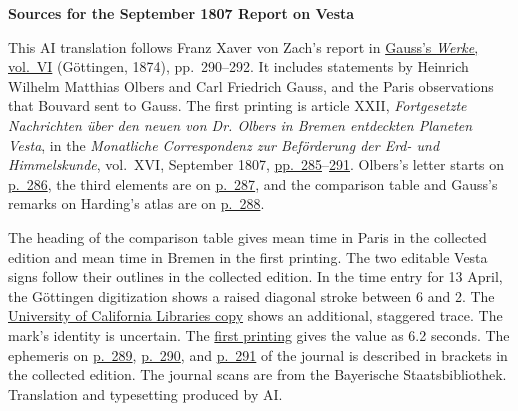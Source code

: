 \clearpage\thispagestyle{empty}
\begin{center}\textbf{Sources for the September 1807 Report on Vesta}\end{center}
\noindent This AI translation follows Franz Xaver von Zach’s report in \href{https://gdz.sub.uni-goettingen.de/id/PPN236007467}{Gauss’s \textit{Werke}, vol.~VI} (Göttingen, 1874), pp.~290--292. It includes statements by Heinrich Wilhelm Matthias Olbers and Carl Friedrich Gauss, and the Paris observations that Bouvard sent to Gauss. The first printing is article XXII, \textit{Fortgesetzte Nachrichten über den neuen von Dr. Olbers in Bremen entdeckten Planeten Vesta}, in the \textit{Monatliche Correspondenz zur Beförderung der Erd- und Himmelskunde}, vol.~XVI, September 1807, \href{https://www.digitale-sammlungen.de/en/view/bsb10538607?page=299}{pp.~285}--\href{https://www.digitale-sammlungen.de/en/view/bsb10538607?page=305}{291}. Olbers’s letter starts on \href{https://www.digitale-sammlungen.de/en/view/bsb10538607?page=300}{p.~286}, the third elements are on \href{https://www.digitale-sammlungen.de/en/view/bsb10538607?page=301}{p.~287}, and the comparison table and Gauss’s remarks on Harding’s atlas are on \href{https://www.digitale-sammlungen.de/en/view/bsb10538607?page=302}{p.~288}.
\par\medskip
The heading of the comparison table gives mean time in Paris in the collected edition and mean time in Bremen in the first printing. The two editable Vesta signs follow their outlines in the collected edition. In the time entry for 13 April, the Göttingen digitization shows a raised diagonal stroke between 6 and 2. The \href{https://archive.org/details/werkecarlf06gausrich}{University of California Libraries copy} shows an additional, staggered trace. The mark’s identity is uncertain. The \href{https://www.digitale-sammlungen.de/en/view/bsb10538607?page=302}{first printing} gives the value as 6.2 seconds. The ephemeris on \href{https://www.digitale-sammlungen.de/en/view/bsb10538607?page=303}{p.~289}, \href{https://www.digitale-sammlungen.de/en/view/bsb10538607?page=304}{p.~290}, and \href{https://www.digitale-sammlungen.de/en/view/bsb10538607?page=305}{p.~291} of the journal is described in brackets in the collected edition. The journal scans are from the Bayerische Staatsbibliothek. Translation and typesetting produced by AI.
\clearpage
